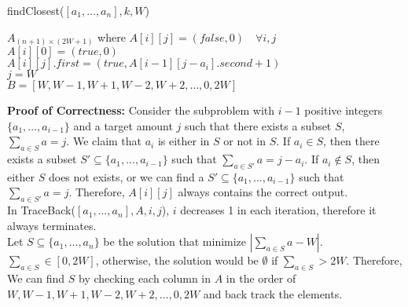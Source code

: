 \documentclass[11pt]{article}
\begin{document}
\begin{enumerate}
\newpage
\begin{algorithm} [h]
    \caption{findClosest($[a_1, \dots, a_n], k, W$)}
    $A_{(n + 1) \times (2W + 1)}$ where $A[i][j] = (false, 0) \quad \forall i, j$ \\
    $A[i][0] = (true, 0)$\\
     {
         {
              {
                $A[i][j].first = (true, A[i - 1][j - a_i].second + 1)$\\
            } 
        }
    }
    $j = W$\\
    $B = [W, W - 1, W + 1, W - 2, W + 2, \dots, 0, 2W]$\\
     {
    }
\end{algorithm}

\textbf{Proof of Correctness:} Consider the subproblem with $i - 1$ positive integers $\{a_1, \dots, a_{i - 1}\}$ 
and a target amount $j$ such that there exists a subset $S$, $\sum_{a \in S} a = j$. We claim that $a_i$ is 
either in $S$ or not in $S$. If $a_i \in S$, then there exists a subset $S' \subseteq \{a_1, ..., a_{i - 1}\}$ 
such that $\sum_{a \in S'} a = j - a_i$. If $a_i \notin S$, then either $S$ does not exists, or we can find a 
$S' \subseteq \{a_1, ..., a_{i - 1}\}$ such that  $\sum_{a \in S'} a = j$. Therefore, $A[i][j]$ always contains 
the correct output.\\
In TraceBack($[a_1, \dots, a_n], A, i, j$), $i$ decreases 1 in each iteration, therefore it always terminates.\\
Let $S \subseteq \{a_1, ..., a_n\}$ be the solution that minimize $|\sum_{a \in S} a - W|$. 
$\sum_{a \in S} \in [0, 2W]$, otherwise, the solution would be $\emptyset$ if $\sum_{a \in S} > 2W$. Therefore,  
We can find $S$ by checking each column in $A$ in the order of $W, W - 1, W + 1, W - 2, W + 2, \dots, 0, 2W$ 
and back track the elements.


\end{enumerate}
\end{document}
